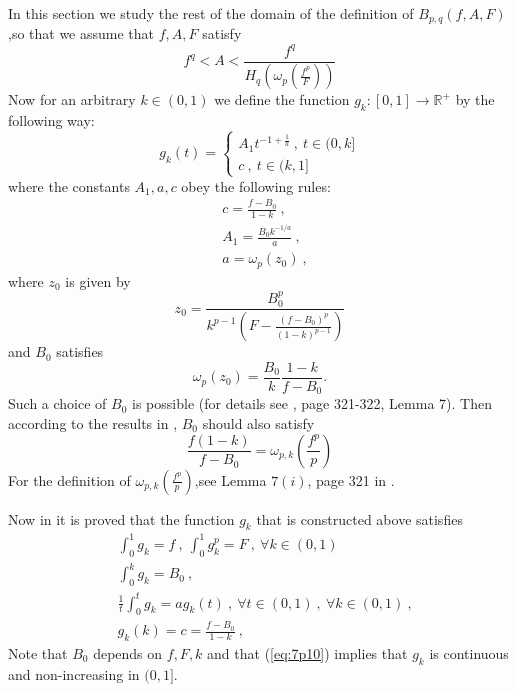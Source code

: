 \documentclass{article}
\numberwithin{equation}{section}
\theoremstyle{definition}
\theoremstyle{remark}
\begin{document}
In this section we study the rest of the domain of the definition of $B_{p,q}(f,A,F)$,so that we assume that $f,A,F$ satisfy
\begin{equation} \label{eq:7p1}
   f^q < A < \frac{f^q}{H_q \left ( \omega_p \left ( \frac{f^p}{F} \right ) \right )} 
\end{equation}
%
Now for an arbitrary $k \in (0,1)$ we define the function
$g_k : [0,1] \to \mathbb{R}^+$ by the following way:
\[
g_k(t) = \begin{cases}
    A_1 t^{-1+\frac{1}{a}}\ , \ t\in (0,k] \\
    c \ , \ t \in (k,1]
\end{cases}
\]
%
where the constants $A_1,a,c$ obey the following rules:
%
\begin{align}
    &c = \frac{f-B_0}{1-k} \ , \label{eq:7p2} \\
    &A_1 = \frac{B_0 k^{-1/a}}{a} \ , \label{eq:7p3} \\
    &a = \omega_p(z_0) \ , \label{eq:7p4}
\end{align}
%
where $z_0$ is given by 
\begin{equation} \label{eq:7p5}
z_0 = \frac{B_0^p}{k^{p-1} \left ( F - \frac{(f-B_0)^p}{(1-k)^{p-1}} \right )}
\end{equation}
%
and $B_0$ satisfies
%
\begin{equation} \label{eq:7p6}
    \omega_p(z_0) = \frac{B_0}{k} \frac{1-k}{f-B_0} .
\end{equation}
%
Such a choice of $B_0$ is possible (for details see \cite{M}, page 321-322, Lemma 7). Then according to the results in \cite{M} , $B_0$ should also satisfy
%
\begin{equation} \label{eq:7p7}
    \frac{f(1-k)}{f-B_0} = \omega_{p,k} \left ( \frac{f^p}{p} \right ) 
\end{equation}
%
For the definition of $\omega_{p,k} \left ( \frac{f^p}{p} \right ) $,see Lemma $7(i)$, page 321 in \cite{M}.

\vspace{5mm}

\noindent Now in \cite{N5} it is proved that the function $g_k$ that is constructed above satisfies
%
\begin{align}
    &\int_0^1 g_k = f \ , \ \int_0^1 g_k^p = F \ , \ \forall k \in (0,1) \label{eq:7p8} \\
    &\int_0^k g_k = B_0 \ , \label{eq:7p9} \\
    &\frac{1}{t} \int_0^t g_k = a g_k(t) \ , \ \forall t \in (0,1) \ , \ \forall k \in (0,1) \ , \label{eq:7p10} \\
    &g_k(k) = c = \frac{f-B_0}{1-k} \ , \label{eq:7p11}
\end{align}
%
Note that $B_0$ depends on $f,F,k$ and that (\ref{eq:7p10}) implies that $g_k$ is continuous and non-increasing in $(0,1]$.
\end{document}
